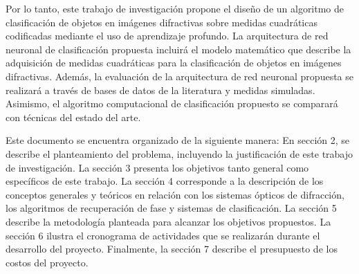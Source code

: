 Por lo tanto, este trabajo de investigación propone el diseño de un algoritmo de clasificación de objetos en imágenes difractivas sobre medidas cuadráticas codificadas mediante el uso de aprendizaje profundo. La arquitectura de red neuronal de clasificación propuesta incluirá el modelo matemático que describe la adquisición de medidas cuadráticas para la clasificación de objetos en imágenes difractivas. Además, la evaluación de la arquitectura de red neuronal propuesta se realizará a través de bases de datos de la literatura y medidas simuladas. Asimismo, el algoritmo computacional de clasificación propuesto se comparará con técnicas del estado del arte.


Este documento se encuentra organizado de la siguiente manera: En sección 2, se describe el planteamiento del problema, incluyendo la justificación de este trabajo de investigación. La sección 3 presenta los objetivos tanto general como específicos de este trabajo. La sección 4 corresponde a la descripción de los conceptos generales y teóricos en relación con los sistemas ópticos de difracción, los algoritmos de recuperación de fase y sistemas de clasificación. La sección 5 describe la metodología planteada para alcanzar los objetivos propuestos. La sección 6 ilustra el cronograma de actividades que se realizarán durante el desarrollo del proyecto. Finalmente, la sección 7 describe el presupuesto de los costos del proyecto. 


\pagebreak